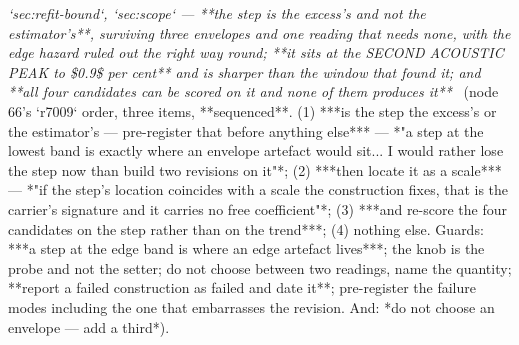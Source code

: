 \begin{description}
\textit{`sec:refit-bound`, `sec:scope` --- **the step is the excess's and not the estimator's**, surviving three envelopes and one reading that needs none, with the edge hazard ruled out the right way round; **it sits at the SECOND ACOUSTIC PEAK to \$0.9\$ per cent** and is sharper than the window that found it; and **all four candidates can be scored on it and none of them produces it**} \ (node 66's `r7009` order, three items, **sequenced**. (1) ***is the step the excess's or the estimator's --- pre-register that before anything else*** --- *"a step at the lowest band is exactly where an envelope artefact would sit... I would rather lose the step now than build two revisions on it"*; (2) ***then locate it as a scale*** --- *"if the step's location coincides with a scale the construction fixes, that is the carrier's signature and it carries no free coefficient"*; (3) ***and re-score the four candidates on the step rather than on the trend***; (4) nothing else.  Guards: ***a step at the edge band is where an edge artefact lives***; the knob is the probe and not the setter; do not choose between two readings, name the quantity; **report a failed construction as failed and date it**; pre-register the failure modes including the one that embarrasses the revision.  And: *do not choose an envelope --- add a third*). 

\end{description}
